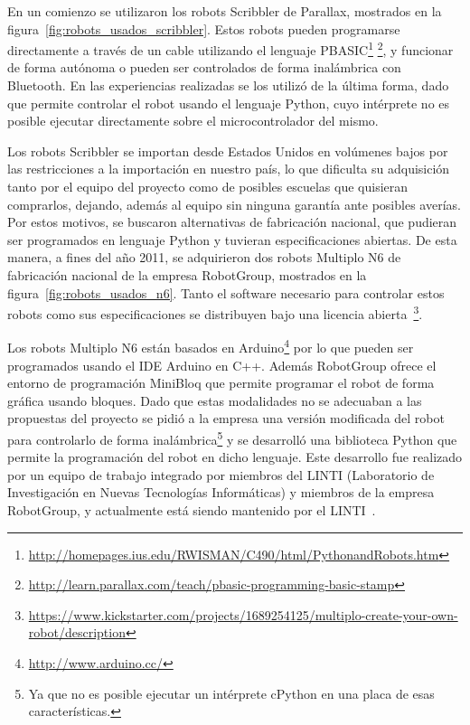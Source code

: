 En un comienzo se utilizaron los robots Scribbler de Parallax, mostrados en
la figura~\ref{fig:robots_usados_scribbler}. Estos robots pueden programarse
directamente a través de un cable utilizando  el lenguaje
PBASIC\footnote{\url{http://homepages.ius.edu/RWISMAN/C490/html/PythonandRobots.htm}}
\footnote{\url{http://learn.parallax.com/teach/pbasic-programming-basic-stamp}},
y funcionar de forma autónoma o pueden ser controlados de forma
inalámbrica con Bluetooth. En las experiencias realizadas se los utilizó de
la última
forma, dado  que permite controlar el robot usando el lenguaje Python,
cuyo intérprete no
es posible ejecutar directamente sobre el microcontrolador del mismo.

Los robots Scribbler se importan desde Estados Unidos en volúmenes bajos
por las restricciones a la importación en nuestro país, lo que
dificulta su adquisición tanto por el equipo del proyecto como de posibles
escuelas que quisieran comprarlos, dejando, además al equipo sin ninguna
garantía
ante posibles averías. Por estos motivos, se buscaron alternativas de
fabricación nacional,
que pudieran ser programados en lenguaje Python y tuvieran especificaciones
abiertas.
De esta manera, a fines del año 2011, se adquirieron dos robots Multiplo N6
de fabricación nacional de
la empresa RobotGroup, mostrados en la figura~\ref{fig:robots_usados_n6}.
Tanto el software necesario para controlar estos robots como sus
especificaciones se distribuyen bajo una licencia
abierta~\footnote{\url{https://www.kickstarter.com/projects/1689254125/multiplo-create-your-own-robot/description}}.

Los robots Multiplo N6 están basados en
Arduino\footnote{\url{http://www.arduino.cc/}}
por lo que pueden ser programados
usando el IDE Arduino en C++. Además RobotGroup ofrece el entorno de programación
MiniBloq que permite programar el robot de forma gráfica usando bloques.
Dado que estas modalidades no se adecuaban a las propuestas del proyecto
se pidió a la empresa una versión modificada del robot para controlarlo de forma
inalámbrica\footnote{Ya que no es posible ejecutar un intérprete cPython en una
placa de esas características.} y se
desarrolló
una biblioteca Python que permite la programación del robot en dicho lenguaje. Este
desarrollo fue realizado por un equipo de trabajo integrado por miembros del
LINTI (Laboratorio de Investigación en Nuevas Tecnologías Informáticas)
y miembros de la empresa RobotGroup, y actualmente está
siendo mantenido por el LINTI~\citep{diaz_aprendiendo_2012}.

